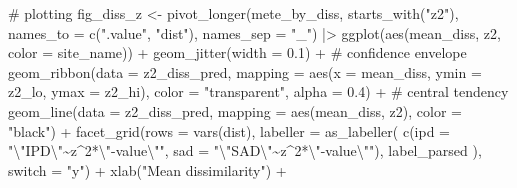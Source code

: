 \documentclass[
  letterpaper,
  DIV=11,
  numbers=noendperiod]{scrartcl}
\newenvironment{Shaded}{\begin{snugshade}}{\end{snugshade}}
\newcommand{\AttributeTok}[1]{\textcolor[rgb]{0.40,0.45,0.13}{#1}}
\newcommand{\CommentTok}[1]{\textcolor[rgb]{0.37,0.37,0.37}{#1}}
\newcommand{\FloatTok}[1]{\textcolor[rgb]{0.68,0.00,0.00}{#1}}
\newcommand{\FunctionTok}[1]{\textcolor[rgb]{0.28,0.35,0.67}{#1}}
\newcommand{\NormalTok}[1]{\textcolor[rgb]{0.00,0.23,0.31}{#1}}
\newcommand{\OtherTok}[1]{\textcolor[rgb]{0.00,0.23,0.31}{#1}}
\newcommand{\SpecialCharTok}[1]{\textcolor[rgb]{0.37,0.37,0.37}{#1}}
\newcommand{\StringTok}[1]{\textcolor[rgb]{0.13,0.47,0.30}{#1}}
\begin{document}
\begin{Shaded}
\begin{Highlighting}[]
\CommentTok{\# plotting}
\NormalTok{fig\_diss\_z }\OtherTok{\textless{}{-}} \FunctionTok{pivot\_longer}\NormalTok{(mete\_by\_diss, }\FunctionTok{starts\_with}\NormalTok{(}\StringTok{"z2"}\NormalTok{), }
                           \AttributeTok{names\_to =} \FunctionTok{c}\NormalTok{(}\StringTok{".value"}\NormalTok{, }\StringTok{"dist"}\NormalTok{), }
                           \AttributeTok{names\_sep =} \StringTok{"\_"}\NormalTok{) }\SpecialCharTok{|\textgreater{}} 
    \FunctionTok{ggplot}\NormalTok{(}\FunctionTok{aes}\NormalTok{(mean\_diss, z2, }\AttributeTok{color =}\NormalTok{ site\_name)) }\SpecialCharTok{+}
    \FunctionTok{geom\_jitter}\NormalTok{(}\AttributeTok{width =} \FloatTok{0.1}\NormalTok{) }\SpecialCharTok{+}
    \CommentTok{\# confidence envelope}
    \FunctionTok{geom\_ribbon}\NormalTok{(}\AttributeTok{data =}\NormalTok{ z2\_diss\_pred, }
                \AttributeTok{mapping =} \FunctionTok{aes}\NormalTok{(}\AttributeTok{x =}\NormalTok{ mean\_diss, }
                              \AttributeTok{ymin =}\NormalTok{ z2\_lo, }
                              \AttributeTok{ymax =}\NormalTok{ z2\_hi), }
                \AttributeTok{color =} \StringTok{"transparent"}\NormalTok{, }\AttributeTok{alpha =} \FloatTok{0.4}\NormalTok{) }\SpecialCharTok{+}
    \CommentTok{\# central tendency }
    \FunctionTok{geom\_line}\NormalTok{(}\AttributeTok{data =}\NormalTok{ z2\_diss\_pred, }
              \AttributeTok{mapping =} \FunctionTok{aes}\NormalTok{(mean\_diss, z2), }
              \AttributeTok{color =} \StringTok{"black"}\NormalTok{) }\SpecialCharTok{+}
    \FunctionTok{facet\_grid}\NormalTok{(}\AttributeTok{rows =} \FunctionTok{vars}\NormalTok{(dist), }
               \AttributeTok{labeller =} \FunctionTok{as\_labeller}\NormalTok{(}
                   \FunctionTok{c}\NormalTok{(}\AttributeTok{ipd =} \StringTok{"}\SpecialCharTok{\textbackslash{}"}\StringTok{IPD}\SpecialCharTok{\textbackslash{}"}\StringTok{\textasciitilde{}z\^{}2*}\SpecialCharTok{\textbackslash{}"}\StringTok{{-}value}\SpecialCharTok{\textbackslash{}"}\StringTok{"}\NormalTok{, }
                     \AttributeTok{sad =} \StringTok{"}\SpecialCharTok{\textbackslash{}"}\StringTok{SAD}\SpecialCharTok{\textbackslash{}"}\StringTok{\textasciitilde{}z\^{}2*}\SpecialCharTok{\textbackslash{}"}\StringTok{{-}value}\SpecialCharTok{\textbackslash{}"}\StringTok{"}\NormalTok{),}
\NormalTok{                   label\_parsed}
\NormalTok{               ), }
               \AttributeTok{switch =} \StringTok{"y"}\NormalTok{) }\SpecialCharTok{+}
    \FunctionTok{xlab}\NormalTok{(}\StringTok{"Mean dissimilarity"}\NormalTok{) }\SpecialCharTok{+}

\end{Highlighting}
\end{Shaded}
\end{document}
